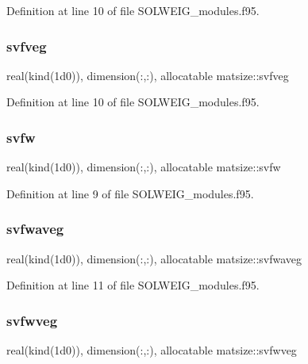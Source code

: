 Definition at line 10 of file S\+O\+L\+W\+E\+I\+G\+\_\+modules.\+f95.

\mbox{\label{namespacematsize_a6017bc4aa42fb2d8ee48357bcdfe5cc0}} 
\subsubsection{\texorpdfstring{svfveg}{svfveg}}
{\footnotesize\ttfamily real(kind(1d0)), dimension(\+:,\+:), allocatable matsize\+::svfveg}



Definition at line 10 of file S\+O\+L\+W\+E\+I\+G\+\_\+modules.\+f95.

\mbox{\label{namespacematsize_a2741fe4703b92bb6ec505998bace4876}} 
\subsubsection{\texorpdfstring{svfw}{svfw}}
{\footnotesize\ttfamily real(kind(1d0)), dimension(\+:,\+:), allocatable matsize\+::svfw}



Definition at line 9 of file S\+O\+L\+W\+E\+I\+G\+\_\+modules.\+f95.

\mbox{\label{namespacematsize_a3633eecab7a13f6237b02654e68b38be}} 
\subsubsection{\texorpdfstring{svfwaveg}{svfwaveg}}
{\footnotesize\ttfamily real(kind(1d0)), dimension(\+:,\+:), allocatable matsize\+::svfwaveg}



Definition at line 11 of file S\+O\+L\+W\+E\+I\+G\+\_\+modules.\+f95.

\mbox{\label{namespacematsize_ae38605d352d15e1892af2d300eed4767}} 
\subsubsection{\texorpdfstring{svfwveg}{svfwveg}}
{\footnotesize\ttfamily real(kind(1d0)), dimension(\+:,\+:), allocatable matsize\+::svfwveg}



